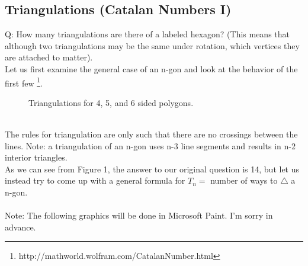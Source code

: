 \label{08-0219}

% 





% 




\subsection{Triangulations (Catalan Numbers I)}
Q: How many triangulations are there of a labeled hexagon? (This means that although two triangulations may be the same under rotation, which vertices they are attached to matter).\\
Let us first examine the general case of an n-gon and look at the behavior of the first few \footnote{http://mathworld.wolfram.com/CatalanNumber.html}.\\
\begin{figure}[h]
  \caption{Triangulations for 4, 5, and 6 sided polygons.}
  \label{fig:triangs1}
\end{figure}\\
The rules for triangulation are only such that there are no crossings between the lines. Note: a triangulation of an n-gon uses n-3 line segments and results in n-2 interior triangles.\\
As we can see from Figure 1, the answer to our original question is 14, but let us instead try to come up with a general formula for $T_n = $ number of ways to $\triangle$ a n-gon.\\
\\
Note: The following graphics will be done in Microsoft Paint. I'm sorry in advance.\\


